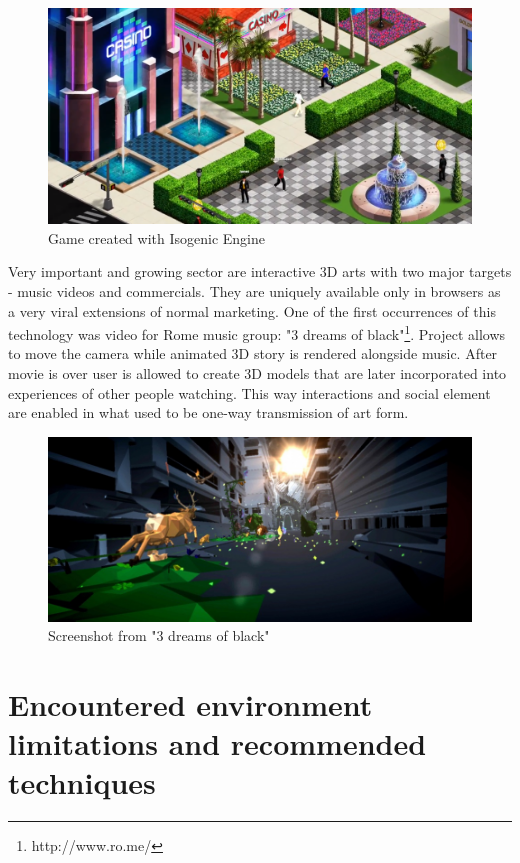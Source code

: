 \begin{figure}[h!]
  \caption{Game created with Isogenic Engine}
  \label{img:isogenic}
  \centering
	\includegraphics[width=12cm]{summary/isogenic.png}
\end{figure}

Very important and growing sector are interactive 3D arts with two major targets - music videos and commercials. They are uniquely available only in browsers as a very viral extensions of normal marketing. One of the first occurrences of this technology was video for Rome music group: "3 dreams of black"\footnote{http://www.ro.me/}. Project allows to move the camera while animated 3D story is rendered alongside music. After movie is over user is allowed to create 3D models that are later incorporated into experiences of other people watching. This way interactions and social element are enabled in what used to be one-way transmission of art form. 

\begin{figure}[h!]
  \caption{Screenshot from "3 dreams of black"}
  \label{img:rome}
  \centering
	\includegraphics[width=12cm]{summary/rome.jpg}
\end{figure}

\section{Encountered environment limitations and recommended techniques}
\label{sec:limitations}

